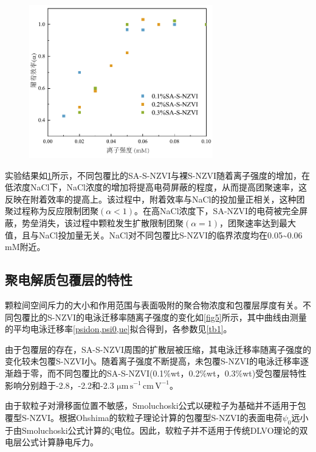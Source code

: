\begin{figure}[h]
    \centering
    \includegraphics[width=8cm]{figs/Graph1.pdf}
    \label{fig4}
\end{figure}

实验结果如\cref{fig4}所示，不同包覆比的SA-S-NZVI与裸S-NZVI随着离子强度的增加，在低浓度NaCl下，NaCl浓度的增加将提高电荷屏蔽的程度，从而提高团聚速率，这反映在附着效率的提高上。该过程中，附着效率与NaCl的投加量正相关，这种团聚过程称为反应限制团聚$(\alpha<1)$。在高NaCl浓度下，SA-NZVI的电荷被完全屏蔽，势垒消失，该过程中颗粒发生扩散限制团聚$(\alpha=1)$，团聚速率达到最大值，且与NaCl投加量无关。NaCl对不同包覆比S-NZVI的临界浓度均在0.05\textasciitilde0.06 mM附近。

\subsection{聚电解质包覆层的特性}

颗粒间空间斥力的大小和作用范围与表面吸附的聚合物浓度和包覆层厚度有关。不同包覆比的S-NZVI的电泳迁移率随离子强度的变化如\cref{fig5}所示，其中曲线由测量的平均电泳迁移率\cref{psidon,psi0,ue}拟合得到，各参数见\cref{tb1}。

由于包覆层的存在，SA-S-NZVI周围的扩散层被压缩，其电泳迁移率随离子强度的变化较未包覆S-NZVI小。随着离子强度不断提高，未包覆S-NZVI的电泳迁移率逐渐趋于零，而不同包覆比的SA-S-NZVI(0.1\%wt，0.2\%wt，0.3\%wt)受包覆层特性影响分别趋于-2.8，-2.2和-2.3 $\mathrm{\mu m\, s^{-1}\, cm\,V^{-1}} $。

由于软粒子对滑移面位置不敏感\cite{1992Electrophoretic}，Smoluchoski公式以硬粒子为基础并不适用于包覆型S-NZVI。根据Ohshima的软粒子理论计算的包覆型S-NZVI的表面电荷$\psi_0$远小于由Smoluchoski公式计算的$\zeta$电位。因此，软粒子并不适用于传统DLVO理论的双电层公式计算静电斥力。

